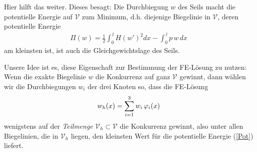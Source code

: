 Hier hilft das  weiter. Dieses besagt: Die Durchbiegung $w$ des Seils macht die potentielle Energie auf $\mathcal{V}$ zum Minimum, d.h. diejenige Biegelinie in $\mathcal{V}$, deren potentielle Energie
\begin{align}\label{Pot} \Pi(w) = \frac{1}{2}
\int_0^{\,l} H (w')^2 dx - \int_0^{\,l} p \, w\, dx
\end{align}
am kleinsten ist, ist auch die Gleichgewichtslage des Seils.

Unsere Idee ist es, diese Eigenschaft zur Bestimmung der FE-L\"{o}sung zu nutzen: Wenn die exakte
Biegelinie $w$ die Konkurrenz auf ganz $\mathcal{V}$ gewinnt, dann w\"{a}hlen wir die Durchbiegungen
$w_i$ der drei Knoten so, dass die FE-L\"{o}sung
\begin{align}\label{Ansatz}
w_{h}(x) = \sum_{i=1}^3 w_i \, \varphi_i(x)
\end{align}
wenigstens auf der {\em Teilmenge} $\mathcal{V}_{h} \subset \mathcal{V}$ die Konkurrenz gewinnt, also unter allen Biegelinien, die in $\mathcal{V}_{h}$ liegen, den kleinsten Wert f\"{u}r die potentielle Energie (\ref{Pot}) liefert.

